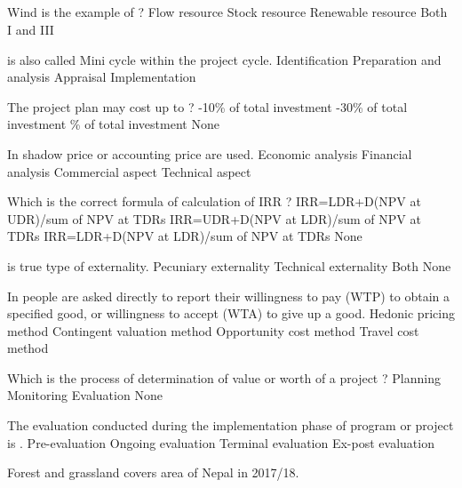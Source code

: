 
\subsection*{}

\begin{questions}

\question Wind is the example of \fillin[][3cm] ?
\choice Flow resource
\choice Stock resource
\choice Renewable resource
\choice Both I and III

\question \fillin[][3cm] is also called Mini cycle within the project cycle.
\choice Identification
\choice Preparation and analysis
\choice Appraisal
\choice Implementation

\question The project plan may cost up to \fillin[][3cm]?
-10\% of total investment
-30\% of total investment
\% of total investment
\choice None

\question In \fillin[][3cm] shadow price or accounting price are used.
\choice Economic analysis
\choice Financial analysis
\choice Commercial aspect
\choice Technical aspect

\question Which is the correct formula of calculation of IRR ?
\choice IRR=LDR+D(NPV at UDR)/sum of NPV at TDRs
\choice IRR=UDR+D(NPV at LDR)/sum of NPV at TDRs
\choice IRR=LDR+D(NPV at LDR)/sum of NPV at TDRs
\choice None

\question \fillin[][3cm] is true type of externality.
\choice Pecuniary externality
\choice Technical externality
\choice Both
\choice None

\question In \fillin[][3cm] people are asked directly to report their willingness to pay (WTP) to obtain a specified good, or willingness to accept (WTA) to give up a good.
\choice Hedonic pricing method
\choice Contingent valuation method
\choice Opportunity cost method
\choice Travel cost method

\question Which is the process of determination of value or worth of a project ?
\choice Planning
\choice Monitoring
\choice Evaluation
\choice None

\question The evaluation conducted during the implementation phase of program or project is \fillin[][3cm].
\choice Pre-evaluation
\choice Ongoing evaluation
\choice Terminal evaluation
\choice Ex-post evaluation

\question Forest and grassland covers \fillin[][3cm] area of Nepal in 2017/18.
%
%
%
%

\end{questions}
